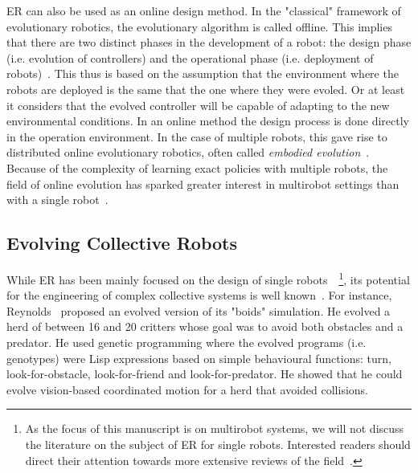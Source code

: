     ER can also be used as an online design method. In the "classical" framework of evolutionary robotics, the evolutionary algorithm is called offline. This implies that there are two distinct phases in the development of a robot: the design phase (i.e. evolution of controllers) and the operational phase (i.e. deployment of robots)~\parencite{Doncieux2015a, Francesca2016}. This thus is based on the assumption that the environment where the robots are deployed is the same that the one where they were evoled. Or at least it considers that the evolved controller will be capable of adapting to the new environmental conditions. In an online method the design process is done directly in the operation environment. In the case of multiple robots, this gave rise to distributed online evolutionary robotics, often called \emph{embodied evolution}~\parencite{Ficici1999, Watson2002}. Because of the complexity of learning exact policies with multiple robots, the field of online evolution has sparked greater interest in multirobot settings than with a single robot~\parencite{Doncieux2015a}.


  \subsection{Evolving Collective Robots}

    While ER has been mainly focused on the design of single robots~\parencite{Nolfi2000, Doncieux2015a}~\footnote{As the focus of this manuscript is on multirobot systems, we will not discuss the literature on the subject of ER for single robots. Interested readers should direct their attention towards more extensive reviews of the field~\parencite{Floreano2008, Bongard2013a, Trianni2014b, Doncieux2015a}.}, its potential for the engineering of complex collective systems is well known~\parencite{Baldassarre2003}. For instance, Reynolds~\parencite{Reynolds1992} proposed an evolved version of its "boids" simulation. He evolved a herd of between 16 and 20 critters whose goal was to avoid both obstacles and a predator. He used genetic programming where the evolved programs (i.e. genotypes) were Lisp expressions based on simple behavioural functions: turn, look-for-obstacle, look-for-friend and look-for-predator. He showed that he could evolve vision-based coordinated motion for a herd that avoided collisions.

